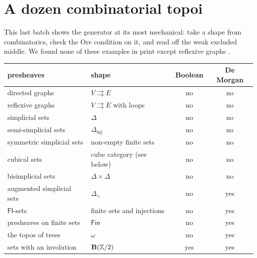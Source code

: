 \section{A dozen combinatorial topoi}\label{sec:shapes}

This last batch shows the generator at its most mechanical: take a shape from combinatorics, check the Ore condition on it, and read off the weak excluded middle. We found none of these examples in print except reflexive graphs \cite[Ex.~2.52]{hemelaer-rogers}.

\begin{theorem}\label{th:shapes}
\begin{center}\small
\begin{tabular}{llcc}
\toprule
presheaves & shape & Boolean & De Morgan\\
\midrule
directed graphs & $V\rightrightarrows E$ & no & no\\
reflexive graphs & $V\rightrightarrows E$ with loops & no & no\\
simplicial sets & $\Delta$ & no & no\\
semi-simplicial sets & $\Delta_{\mathrm{inj}}$ & no & no\\
symmetric simplicial sets & non-empty finite sets & no & no\\
cubical sets & cube category (see below) & no & no\\
bisimplicial sets & $\Delta\times\Delta$ & no & no\\
augmented simplicial sets & $\Delta_+$ & no & yes\\
$\mathsf{FI}$-sets & finite sets and injections & no & yes\\
presheaves on finite sets & $\mathsf{Fin}$ & no & yes\\
the topos of trees & $\omega$ & no & yes\\
sets with an involution & $\mathbf{B}(\mathbb Z/2)$ & yes & yes\\
\bottomrule
\end{tabular}
\end{center}
\end{theorem}

